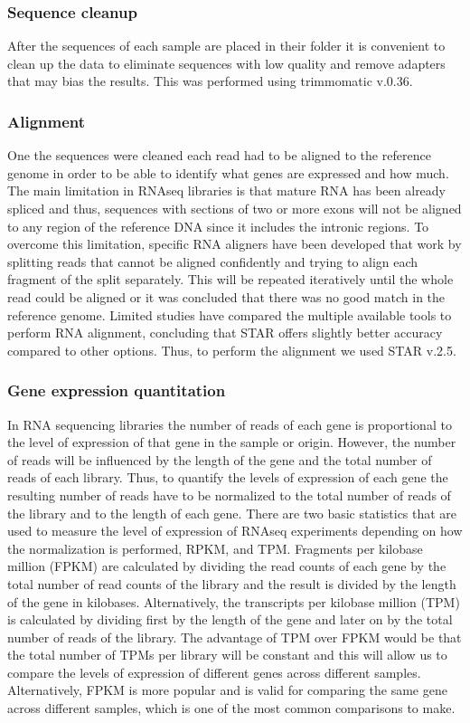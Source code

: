 \subsubsection{Sequence cleanup}
After the sequences of each sample are placed in their folder it is convenient to clean up the data to eliminate sequences with low quality and remove adapters that may bias the results. This was performed using trimmomatic v.0.36.

\subsubsection{Alignment}
One the sequences were cleaned each read had to be aligned to the reference genome in order to be able to identify what genes are expressed and how much. The main limitation in RNAseq libraries is that mature RNA has been already spliced and thus, sequences with sections of two or more exons will not be aligned to any region of the reference DNA since it includes the intronic regions. To overcome this limitation, specific RNA aligners have been developed that work by splitting reads that cannot be aligned confidently and trying to align each fragment of the split separately. This will be repeated iteratively until the whole read could be aligned or it was concluded that there was no good match in the reference genome.  Limited studies have compared the multiple available tools to perform RNA alignment, concluding that STAR offers slightly better accuracy compared to other options. Thus, to perform the alignment we used STAR v.2.5.

\subsubsection{Gene expression quantitation}
In RNA sequencing libraries the number of reads of each gene is proportional to the level of expression of that gene in the sample or origin. However, the number of reads will be influenced by the length of the gene and the total number of reads of each library. Thus, to quantify the levels of expression of each gene the resulting number of reads have to be normalized to the total number of reads of the library and to the length of each gene. There are two basic statistics that are used to measure the level of expression of RNAseq experiments depending on how the normalization is performed, RPKM, and TPM. Fragments per kilobase million (FPKM) are calculated by dividing the read counts of each gene by the total number of read counts of the library and the result is divided by the length of the gene in kilobases. Alternatively, the transcripts per kilobase million (TPM) is calculated by dividing first by the length of the gene and later on by the total number of reads of the library. The advantage of TPM over FPKM would be that the total number of TPMs per library will be constant and this will allow us to compare the levels of expression of different genes across different samples. Alternatively, FPKM is more popular and is valid for comparing the same gene across different samples, which is one of the most common comparisons to make.

